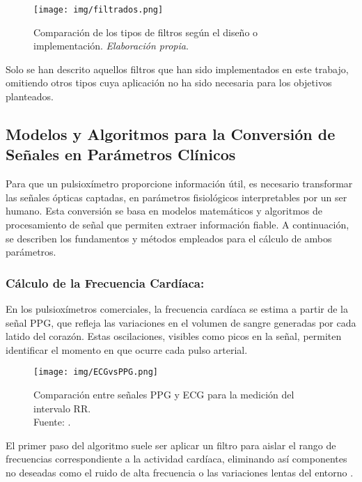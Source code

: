 \begin{figure}[H]
    \centering
    \texttt{[image: img/filtrados.png]}
    \caption{Comparación de los tipos de filtros según el diseño o implementación. \textit{Elaboración propia}.}
    \label{fig:filtrados}
\end{figure}

Solo se han descrito aquellos filtros que han sido implementados en este trabajo, omitiendo otros tipos cuya aplicación no ha sido necesaria para los objetivos planteados.

\subsection{Modelos y Algoritmos para la Conversión de Señales en Parámetros Clínicos}

Para que un pulsioxímetro proporcione información útil, es necesario transformar las señales ópticas captadas, en parámetros fisiológicos interpretables por un ser humano. Esta conversión se basa en modelos matemáticos y algoritmos de procesamiento de señal que permiten extraer información fiable. A continuación, se describen los fundamentos y métodos empleados para el cálculo de ambos parámetros.

\subsubsection{Cálculo de la Frecuencia Cardíaca:}

En los pulsioxímetros comerciales, la frecuencia cardíaca se estima a partir de la señal PPG, que refleja las variaciones en el volumen de sangre generadas por cada latido del corazón. Estas oscilaciones, visibles como picos en la señal, permiten identificar el momento en que ocurre cada pulso arterial.

\begin{figure}[H]
    \centering
    \texttt{[image: img/ECGvsPPG.png]}
    \caption{Comparación entre señales PPG y ECG para la medición del intervalo RR. 
    \\ Fuente: \cite{vandenberk2017fibricheck}.}
    \label{fig:ECGvsPPG}
\end{figure}

El primer paso del algoritmo suele ser aplicar un filtro para aislar el rango de frecuencias correspondiente a la actividad cardíaca, eliminando así componentes no deseadas como el ruido de alta frecuencia o las variaciones lentas del entorno \cite{liu2021wearable}.

